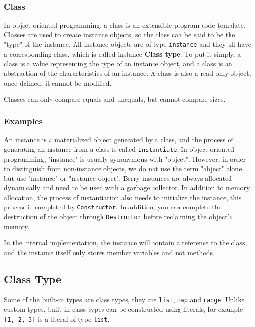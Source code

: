 \subsubsection {Class}

In object-oriented programming, a class is an extensible program code template. Classes are used to create instance objects, so the class can be said to be the "type" of the instance. All instance objects are of type \texttt{instance} and they all have a corresponding class, which is called instance \textbf{Class type}. To put it simply, a class is a value representing the type of an instance object, and a class is an abstraction of the characteristics of an instance. A class is also a read-only object, once defined, it cannot be modified.

Classes can only compare equals and unequals, but cannot compare sizes.

\subsubsection {Examples}

An instance is a materialized object generated by a class, and the process of generating an instance from a class is called \texttt{Instantiate}. In object-oriented programming, "instance" is usually synonymous with "object". However, in order to distinguish from non-instance objects, we do not use the term "object" alone, but use "instance" or "instance object". Berry instances are always allocated dynamically and need to be used with a garbage collector. In addition to memory allocation, the process of instantiation also needs to initialize the instance, this process is completed by \texttt{Constructor}. In addition, you can complete the destruction of the object through \texttt{Destructor} before reclaiming the object's memory.

In the internal implementation, the instance will contain a reference to the class, and the instance itself only stores member variables and not methods.

\subsection {Class Type}

Some of the built-in types are class types, they are \texttt{list}, \texttt{map} and \texttt{range}. Unlike custom types, built-in class types can be constructed using literals, for example \texttt{[1, 2, 3]} is a literal of type \texttt{list}.


